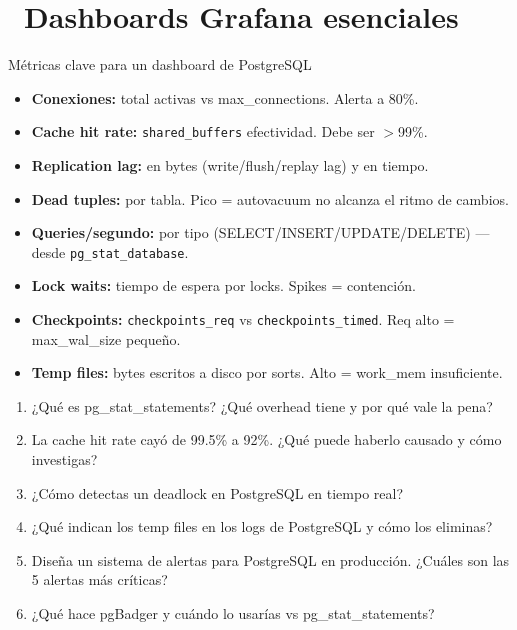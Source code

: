\section[Dashboards Grafana esenciales]{~Dashboards Grafana esenciales}

\begin{teoriabox}{Métricas clave para un dashboard de PostgreSQL}
\begin{itemize}
  \item \textbf{Conexiones:} total activas vs max\_connections. Alerta a 80\%.
  \item \textbf{Cache hit rate:} \texttt{shared\_buffers} efectividad. Debe ser $>$99\%.
  \item \textbf{Replication lag:} en bytes (write/flush/replay lag) y en tiempo.
  \item \textbf{Dead tuples:} por tabla. Pico = autovacuum no alcanza el ritmo de cambios.
  \item \textbf{Queries/segundo:} por tipo (SELECT/INSERT/UPDATE/DELETE) — desde \texttt{pg\_stat\_database}.
  \item \textbf{Lock waits:} tiempo de espera por locks. Spikes = contención.
  \item \textbf{Checkpoints:} \texttt{checkpoints\_req} vs \texttt{checkpoints\_timed}. Req alto = max\_wal\_size pequeño.
  \item \textbf{Temp files:} bytes escritos a disco por sorts. Alto = work\_mem insuficiente.
\end{itemize}
\end{teoriabox}

\begin{entrevistabox}
\begin{enumerate}
  \item ¿Qué es pg\_stat\_statements? ¿Qué overhead tiene y por qué vale la pena?
  \item La cache hit rate cayó de 99.5\% a 92\%. ¿Qué puede haberlo causado y cómo investigas?
  \item ¿Cómo detectas un deadlock en PostgreSQL en tiempo real?
  \item ¿Qué indican los temp files en los logs de PostgreSQL y cómo los eliminas?
  \item Diseña un sistema de alertas para PostgreSQL en producción. ¿Cuáles son las 5 alertas más críticas?
  \item ¿Qué hace pgBadger y cuándo lo usarías vs pg\_stat\_statements?
\end{enumerate}
\end{entrevistabox}
